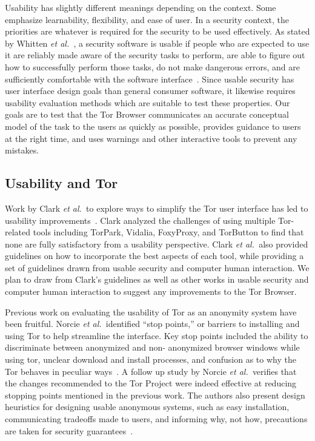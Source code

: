 \documentclass[letterpaper,twocolumn,11pt]{article}
\def\etal{{\it et al.~}}
\begin{document}
Usability has slightly different meanings depending on the context. Some emphasize
learnability, flexibility, and ease of user. In a security context, the priorities are whatever is 
required for the security to be used effectively. As stated by Whitten \etal, a security software is 
usable if people who are expected to use it are reliably made aware of the security tasks to perform, 
are able to figure out how to successfully perform those tasks, do not make dangerous errors, and
are sufficiently comfortable with the software interface~\cite{whitten1999johnny}. Since usable security 
has user interface design goals than general consumer software, it likewise requires usability evaluation
methods which are suitable to test these properties. Our goals are to test that the Tor Browser 
communicates an accurate conceptual model of the task to the users as quickly as possible, provides guidance to 
users at the right time, and uses warnings and other interactive tools to prevent any mistakes. 

\subsection{Usability and Tor}
\indent \indent  Work by Clark \etal to explore ways to simplify the Tor user interface
has led to usability improvements~\cite{clark2007usability}.  Clark analyzed the challenges 
of using multiple Tor-related tools including TorPark, Vidalia, FoxyProxy, and TorButton to find that
none are fully satisfactory from a usability perspective.  Clark \etal also provided guidelines on 
how to incorporate the best aspects of each tool, while providing a set of guidelines drawn from
usable security and computer human interaction. We plan to draw from Clark's
guidelines as well as other works in usable security and computer human interaction to suggest
any improvements to the Tor Browser. 

Previous work on evaluating the usability of Tor as an anonymity system have been fruitful. 
Norcie \etal identified ``stop points,'' or barriers to installing and using Tor to help streamline
the interface. Key stop points included the ability to discriminate between anonymized and non-
anonymized browser windows while using tor, unclear download and install processes, and 
confusion as to why the Tor behaves in peculiar ways~\cite{norcie2012eliminating}. A follow up
study by Norcie \etal verifies that the changes recommended to the Tor Project were indeed 
effective at reducing stopping points mentioned in the previous work. The authors also present
design heuristics for designing usable anonymous systems, such as easy installation, communicating
tradeoffs made to users, and informing why, not how, precautions are taken for security guarantees~\cite{norcie2014johnny}. 
\end{document}
